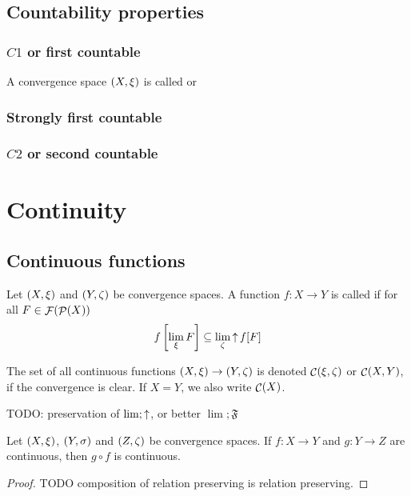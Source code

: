 \subsection{Countability properties}
\subsubsection{$C1$ or first countable}
\begin{definition}
A convergence space $\left( X, \xi \right)$ is called  or 
\end{definition}

\subsubsection{Strongly first countable}

\subsubsection{$C2$ or second countable}

\section{Continuity}
\subsection{Continuous functions}
\begin{definition}
Let $\left( X,\xi \right)$ and $\left( Y,\zeta \right)$ be convergence spaces. A function $f: X\to Y$ is called  if for all $F \in \mathop{\mathcal{F}}(\mathop{\mathcal{P}}(X))$
\[ f\left[\lim_\xi F \right] \subseteq \lim_\zeta \mathop{\uparrow} f[F] \]

The set of all continuous functions $\left( X,\xi \right) \to \left( Y,\zeta \right)$ is denoted $\mathop{\mathcal{C}}(\xi, \zeta)$ or $\mathop{\mathcal{C}}(X,Y)$, if the convergence is clear. If $X=Y$, we also write $\mathop{\mathcal{C}}(X)$.
\end{definition}
TODO: preservation of $\lim; \mathop{\uparrow}$, or better $\lim; \mathfrak{F}$

\begin{lemma} \label{continuityComposition}
Let $\left( X,\xi \right)$, $\left( Y,\sigma \right)$ and $\left( Z,\zeta \right)$ be convergence spaces. If $f: X\to Y$ and $g: Y\to Z$ are continuous, then $g\circ f$ is continuous.
\end{lemma}
\begin{proof}
TODO composition of relation preserving is relation preserving.
\end{proof}

